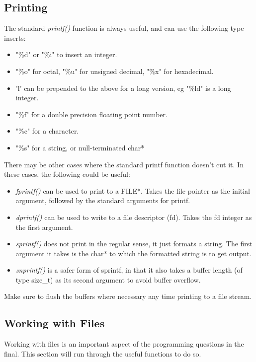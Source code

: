 \documentclass{article}
\begin{document}
\subsection{Printing}
The standard \textit{printf()} function is always useful, and can use the following type inserts:
\begin{itemize}
    \item "\%d" or "\%i" to insert an integer.
    \item "\%o" for octal, "\%u" for unsigned decimal, "\%x" for hexadecimal.
    \item 'l' can be prepended to the above for a long version, eg "\%ld" is a long integer.
    \item "\%f" for a double precision floating point number.
    \item "\%c" for a character.
    \item "\%s" for a string, or null-terminated char*
\end{itemize}
There may be other cases where the standard printf function doesn't cut it. In these cases, the following could be useful:
\begin{itemize}
    \item \textit{fprintf()} can be used to print to a FILE*. Takes the file pointer as the initial argument, followed by the standard arguments for printf.
    \item \textit{dprintf()} can be used to write to a file descriptor (fd). Takes the fd integer as the first argument.
    \item \textit{sprintf()} does not print in the regular sense, it just formats a string. The first argument it takes is the char* to which the formatted string is to get output.
    \item \textit{snprintf()} is a safer form of sprintf, in that it also takes a buffer length (of type size\_t) as its second argument to avoid buffer overflow.
\end{itemize}
Make sure to flush the buffers where necessary any time printing to a file stream.

\subsection{Working with Files}
Working with files is an important aspect of the programming questions in the final. This section will run through the useful functions to do so.
\end{document}
